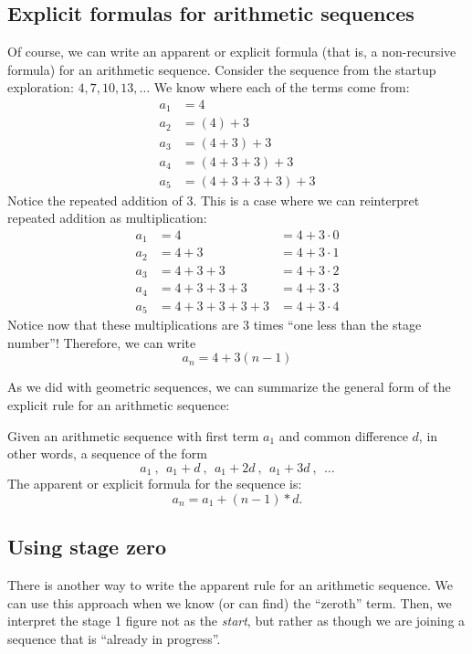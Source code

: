 \subsection{Explicit formulas for arithmetic sequences}

Of course, we can write an apparent or explicit formula (that is, a non-recursive formula) for an arithmetic sequence. Consider the sequence from the startup exploration: $4, 7, 10, 13, \dotsc$ We know where each of the terms come from:
\[\begin{aligned}
a_1 &= 4
\\
a_2 &= (4) + 3
\\
a_3 &= (4 + 3) + 3
\\
a_4 &= (4 + 3 + 3) + 3
\\
a_5 &= (4 + 3 + 3 + 3) + 3
\end{aligned}\]
Notice the repeated addition of 3. This is a case where we can reinterpret repeated addition as multiplication:
\[\begin{aligned}
a_1 &= 4 				&= 4 + 3\cdot0 
\\
a_2 &= 4 +3			&= 4 + 3\cdot1
\\
a_3 &= 4 +3 +3			&= 4 + 3\cdot2
\\
a_4 &= 4 +3 +3 +3		&= 4 + 3\cdot3
\\
a_5 &= 4 +3 +3 +3 +3	&= 4 + 3\cdot4
\end{aligned}\]
Notice now that these multiplications are 3 times ``one less than the stage number''! Therefore, we can write \[a_n = 4 + 3 (n-1)\]

As we did with geometric sequences, we can summarize the general form of the explicit rule for an arithmetic sequence:

\begin{boxdef}
Given an arithmetic sequence with first term $a_1$ and common difference $d$, in other words, a sequence of the form \[a_1~,~~ a_1 + d~,~~ a_1 + 2d~,~~ a_1 + 3d~,~~ \dotsc\] The apparent or explicit formula for the sequence is: \[a_n = a_1 + (n-1) \ast d.\]
\end{boxdef}

\subsection{Using stage zero}

There is another way to write the apparent rule for an arithmetic sequence. We can use this approach when we know (or can find) the ``zeroth'' term. Then, we interpret the stage 1 figure not as the \textit{start}, but rather as though we are joining a sequence that is ``already in progress''.

